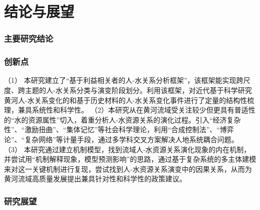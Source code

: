 \chapter{结论与展望}

\subsection{主要研究结论}

\subsection{创新点}
（1） 本研究建立了“基于利益相关者的人-水关系分析框架”，该框架能实现跨尺度、跨主题的人-水关系分类与演变阶段划分。利用该框架，对近代基于科学研究黄河人-水关系变化的和基于历史材料的人-水关系变化事件进行了定量的结构性梳理，兼具系统性和科学性。
（2）本研究从在黄河流域受关注较少但更具有普适性的“水的资源属性”切入，着重分析人-水资源关系的演化过程。引入“经济复杂性”、“激励扭曲”、“集体记忆”等社会科学理论，利用“合成控制法”、“博弈论”、“复杂网络”等计量手段，通过多学科交叉方案解决人地系统耦合问题。
（3） 本研究通过建立机制模型，找到流域人-水资源关系演化现象的内在机制，并尝试用“机制解释现象，模型预测影响”的思路，通过基于复杂系统的多主体建模来对这一关键机制进行复现，尝试找到人-水资源关系演变中的因果关系，从而为黄河流域高质量发展提出兼具针对性和科学性的政策建议。

\subsection{研究展望}

